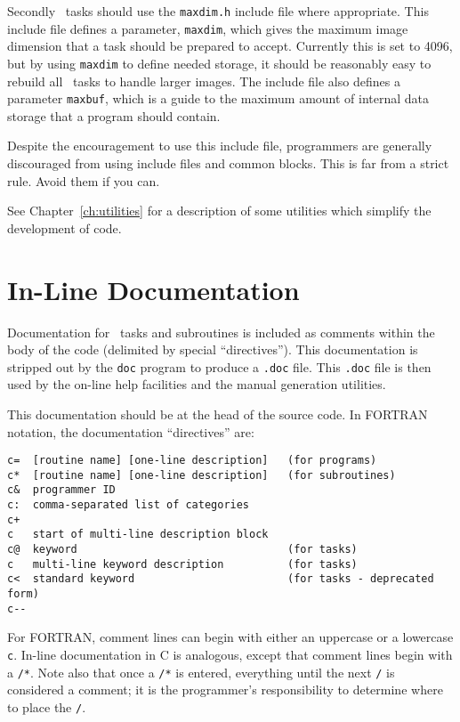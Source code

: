 Secondly \miriad\ tasks should use the {\tt maxdim.h} include file where
appropriate. This include file
defines a parameter, {\tt maxdim}, which gives the maximum image dimension
that a task should be prepared to accept. Currently this is set to
4096, but by using {\tt maxdim} to define needed storage, it should
be reasonably easy to rebuild all \miriad\ tasks to handle larger images.
The include file also defines a parameter {\tt maxbuf}, which is a guide
to the maximum amount of internal data storage that a program should contain.

Despite the encouragement to use this include file, programmers are generally
discouraged
from using include files and common blocks. This is far from a strict rule.
Avoid them if you can.

See Chapter~\ref{ch:utilities} for a description of some utilities which
simplify the development of code.

\section{In-Line Documentation}
Documentation for \miriad\ tasks and subroutines is included as comments
within the body of the code (delimited by special ``directives''). This
documentation is stripped out by the \verb+doc+ program to produce a
\verb+.doc+ file. This \verb+.doc+ file is then used by the on-line
help facilities and the manual generation utilities.

This documentation should be at the head of the source code.  In FORTRAN
notation, the documentation ``directives'' are:
{\begin{verbatim}
c=  [routine name] [one-line description]   (for programs)
c*  [routine name] [one-line description]   (for subroutines)
c&  programmer ID
c:  comma-separated list of categories
c+
c   start of multi-line description block
c@  keyword                                 (for tasks)
c   multi-line keyword description          (for tasks)
c<  standard keyword                        (for tasks - deprecated form)
c-- 
\end{verbatim}}
For FORTRAN, comment lines can begin with either an uppercase or a 
lowercase {\tt c}. In-line documentation in C is analogous, except that
comment lines begin with a {\tt /*}. Note also that once a
{\tt /*} is entered, everything until the next {\tt */} is considered
a comment; it is the programmer's responsibility to determine where to
place the {\tt */}.

